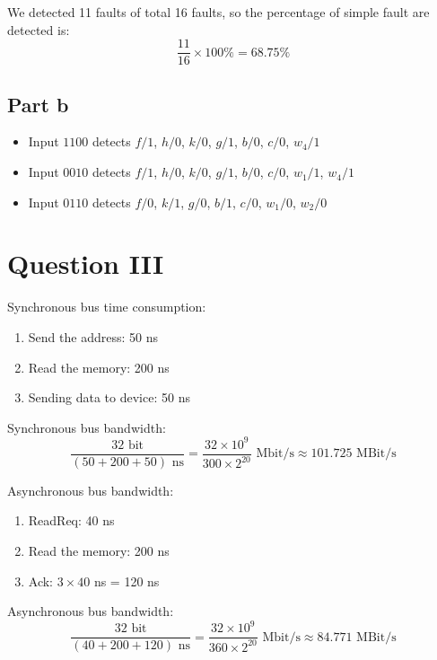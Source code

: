\documentclass[12pt, a4paper]{article}
\begin{document}
	We detected 11 faults of total 16 faults, so the percentage of simple fault are detected
	is:
	$$\frac{11}{16} \times 100\% = 68.75\%$$
	
	\subsection*{Part b}
	\begin{itemize}
		\item Input $1100$ detects $f/1$, $h/0$, $k/0$, $g/1$, $b/0$, $c/0$, $w_4/1$
		\item Input $0010$ detects $f/1$, $h/0$, $k/0$, $g/1$, $b/0$, $c/0$, $w_1/1$, $w_4/1$
		\item Input $0110$ detects $f/0$, $k/1$, $g/0$, $b/1$, $c/0$, $w_1/0$, $w_2/0$
	\end{itemize}
	
	\section*{Question III}
	Synchronous bus time consumption:
	\begin{enumerate}
		\item Send the address: 50 ns
		\item Read the memory: 200 ns
		\item Sending data to device: 50 ns
	\end{enumerate}
	Synchronous bus bandwidth:
	$$\frac{32\text{ bit}}{(50 + 200 + 50) \text{ ns}} = \frac{32 \times 10 ^ 9}{300 \times 2 ^ {20}}  \text{ Mbit/s} \approx 101.725 \text{ MBit/s}$$
	
	Asynchronous bus bandwidth:
	\begin{enumerate}
		\item ReadReq: 40 ns
		\item Read the memory: 200 ns
		\item Ack: $3 \times 40$ ns = 120 ns
	\end{enumerate}
	Asynchronous bus bandwidth:
	$$\frac{32\text{ bit}}{(40 + 200 + 120) \text{ ns}} = \frac{32 \times 10 ^ 9}{360 \times 2 ^ {20}}  \text{ Mbit/s} \approx 84.771 \text{ MBit/s}$$
\end{document}
